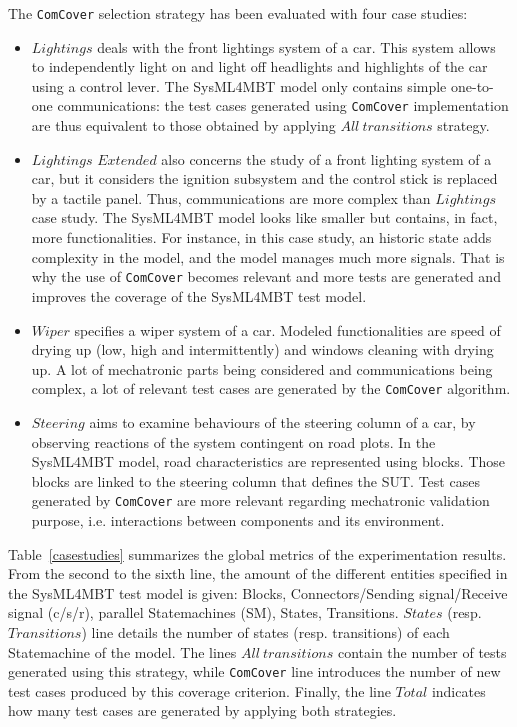 \documentclass{llncs}
\begin{document}
The \texttt{ComCover} selection strategy has been evaluated with four case 
studies:
 \vspace*{-.05cm}
\begin{itemize}
  \item $Lightings$ deals with the front lightings system of a
    car. This system allows to independently light on and light off
    headlights and highlights of the car using a control lever. The
    SysML4MBT model only contains simple one-to-one
    communications: the test cases generated using
    \texttt{ComCover} implementation are thus equivalent to those obtained
    by applying $All~transitions$ strategy. 
   \item $Lightings$ $Extended$ also concerns the study of a front
    lighting system of a car, but it considers the ignition subsystem
    and the control stick is replaced by a tactile panel. Thus,
    communications are more complex than $Lightings$ case study. The
    SysML4MBT model looks like smaller but contains, in fact, more
    functionalities. For instance, in this case study, an historic
    state adds complexity in the model, and the model manages much more
    signals. That is why the use of \texttt{ComCover} becomes relevant
    and more tests are generated and improves the coverage of the
    SysML4MBT test model.
   \item $Wiper$ specifies a wiper system of a car. Modeled
    functionalities are speed of drying up (low, high and
    intermittently) and windows cleaning with drying up. A lot of mechatronic parts being considered and communications being complex, a lot of relevant test cases are generated by the \texttt{ComCover} algorithm. 
    \item $Steering$ aims to examine behaviours of the steering column
    of a car, by observing reactions of the system contingent on road
    plots. In the SysML4MBT model, road characteristics are
    represented using blocks. Those blocks are linked to the steering
    column that defines the SUT. Test cases generated by
    \texttt{ComCover} are more relevant regarding mechatronic
    validation purpose, i.e. interactions between components and its
    environment.
\end{itemize}

Table~\ref{casestudies} summarizes the global metrics of the
experimentation results. From the second to the sixth line, the amount
of the different entities specified in the SysML4MBT test model is
given: Blocks, Connectors/Sending signal/Receive signal (c/s/r),
parallel Statemachines (SM), States, Transitions. $States$ 
(resp. $Transitions$) line details the number of states
(resp. transitions) of each Statemachine of the model. The lines
$All~transitions$ contain the number of tests generated using this
strategy, while \texttt{ComCover} line introduces the number of new
test cases produced by this coverage criterion. Finally, the line
$Total$ indicates how many test cases are generated by applying
both strategies. 
\end{document}
